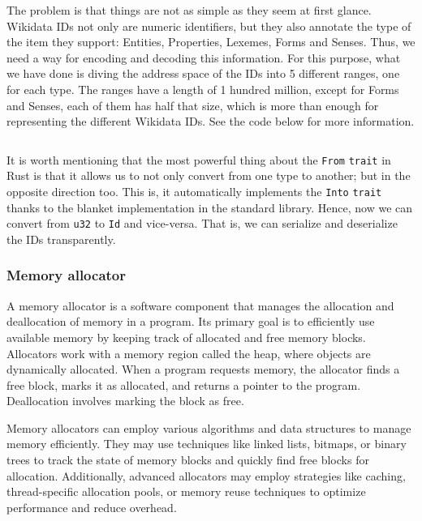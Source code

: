 The problem is that things are not as simple as they seem at first glance. Wikidata IDs not only are numeric identifiers, but they also annotate the type of the item they support: Entities, Properties, Lexemes, Forms and Senses. Thus, we need a way for encoding and decoding this information. For this purpose, what we have done is diving the address space of the IDs into 5 different ranges, one for each type. The ranges have a length of 1 hundred million, except for Forms and Senses, each of them has half that size, which is more than enough for representing the different Wikidata IDs. See the code below for more information.

\begin{code}
    \inputminted{rust}{code/listings/10-1_ids.rs}
\end{code}

It is worth mentioning that the most powerful thing about the \texttt{From} \texttt{trait} in Rust is that it allows us to not only convert from one type to another; but in the opposite direction too. This is, it automatically implements the \texttt{Into} \texttt{trait} thanks to the blanket implementation in the standard library. Hence, now we can convert from \texttt{u32} to \texttt{Id} and vice-versa. That is, we can serialize and deserialize the IDs transparently.

\subsubsection{Memory allocator}

A memory allocator is a software component that manages the allocation and deallocation of memory in a program. Its primary goal is to efficiently use available memory by keeping track of allocated and free memory blocks. Allocators work with a memory region called the heap, where objects are dynamically allocated. When a program requests memory, the allocator finds a free block, marks it as allocated, and returns a pointer to the program. Deallocation involves marking the block as free.

Memory allocators can employ various algorithms and data structures to manage memory efficiently. They may use techniques like linked lists, bitmaps, or binary trees to track the state of memory blocks and quickly find free blocks for allocation. Additionally, advanced allocators may employ strategies like caching, thread-specific allocation pools, or memory reuse techniques to optimize performance and reduce overhead.

